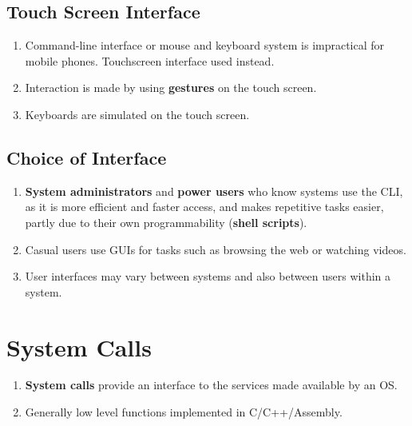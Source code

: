 \documentclass[journal,12pt,twocolumn]{IEEEtran}
\begin{document}
\subsection{Touch Screen Interface}
\begin{enumerate}
    \item Command-line interface or mouse and keyboard system is impractical 
    for mobile phones. Touchscreen interface used instead.
    \item Interaction is made by using \textbf{gestures} on the touch screen.
    \item Keyboards are simulated on the touch screen.
\end{enumerate}

\subsection{Choice of Interface}
\begin{enumerate}
    \item \textbf{System administrators} and \textbf{power users} who know systems 
    use the CLI, as it is more efficient and faster access, and makes repetitive
    tasks easier, partly due to their own programmability (\textbf{shell scripts}).
    \item Casual users use GUIs for tasks such as browsing the web or watching
    videos.
    \item User interfaces may vary between systems and also between users within a 
    system.
\end{enumerate}

\section{System Calls}
\begin{enumerate}
    \item \textbf{System calls} provide an interface to the services made 
    available by an OS.
    \item Generally low level functions implemented in C/C++/Assembly.
\end{enumerate}
\end{document}
